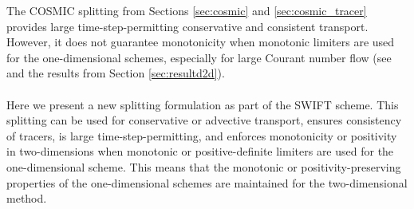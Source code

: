 \documentclass[11pt,a4paper]{article}
\begin{document}
The COSMIC splitting from Sections \ref{sec:cosmic} and \ref{sec:cosmic_tracer} provides large time-step-permitting conservative and consistent transport. However, it does not guarantee monotonicity when monotonic limiters are used for the one-dimensional schemes, especially for large Courant number flow (see \citep{leonard1996cosmic,lin1996ffsl,bott2010improving} and the results from Section \ref{sec:resultd2d}). \\
\\
Here we present a new splitting formulation as part of the SWIFT scheme. This splitting can be used for conservative or advective transport, ensures consistency of tracers, is large time-step-permitting, and enforces monotonicity or positivity in two-dimensions when monotonic or positive-definite limiters are used for the one-dimensional scheme. This means that the monotonic or positivity-preserving properties of the one-dimensional schemes are maintained for the two-dimensional method. 
\end{document}
